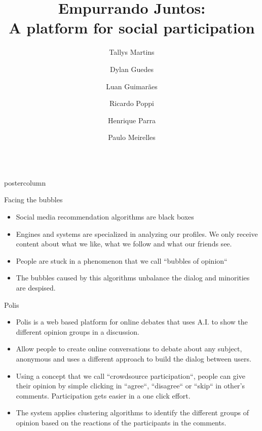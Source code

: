 \documentclass[final,hyperref={pdfpagelabels=false}]{beamer}
\title{\huge\bfseries\hspace*{-1em} Empurrando Juntos: \\A platform for social participation}
\date{}
\author{\large Tallys Martins
\and Dylan Guedes
\and Luan Guimarães \\
\and Ricardo Poppi
\and Henrique Parra
\and Paulo Meirelles
}
\institute[UNB/CD]{University of Brasília and Cidade Democrática NGO, Brazil}
\newlength{\columnheight}
\begin{document}
\begin{frame}
  \begin{columns}
    \begin{column}{.49\textwidth}
      \begin{beamercolorbox}[center,wd=\textwidth]{postercolumn}
        \begin{minipage}[T]{.95\textwidth}
          \parbox[t][\columnheight]{\textwidth}{

\begin{block}{Facing the bubbles}
  \begin{itemize}
    \item Social media recommendation algorithms are black boxes
    
    \item Engines and systems are specialized in analyzing our profiles. We only receive
    content about what we like, what we follow and what our friends see.

    \item People are stuck in a phenomenon that we call ``bubbles of opinion``

    \item The bubbles caused by this algorithms unbalance the dialog and minorities
    are despised.
  \end{itemize}
\end{block}

\begin{block}{Polis}
  \begin{itemize}
    \item Polis is a web based platform for online debates that uses A.I. to
    show the different opinion groups in a discussion.

    \item Allow people to create online conversations to debate about any subject,
    anonymous and uses a different approach to build the dialog between users.

    \item Using a concept that we call ``crowdsource participation``, people can
    give their opinion by simple clicking in ``agree``, ``disagree`` or ``skip``
    in other's comments. Participation gets easier in a one click effort.

    \item The system applies clustering algorithms to identify the different groups
    of opinion based on the reactions of the participants in the comments.


\end{itemize}
\end{block}}
\end{minipage}
\end{beamercolorbox}
\end{column}
\end{columns}
\end{frame}
\end{document}
